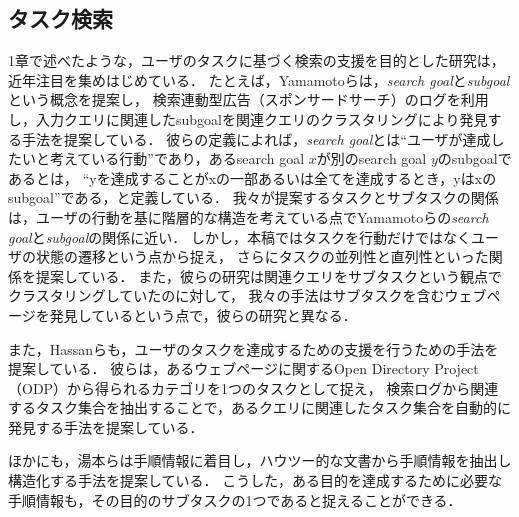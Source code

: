 \documentclass[submit,techreq]{ipsj}
\begin{document}
\subsection{タスク検索}
1章で述べたような，ユーザのタスクに基づく検索の支援を目的とした研究は，近年注目を集めはじめている．
たとえば，Yamamotoらは，\textit{search goal}と\textit{subgoal}という概念を提案し，
検索連動型広告（スポンサードサーチ）のログを利用し，入力クエリに関連したsubgoalを関連クエリのクラスタリングにより発見する手法を提案している\cite{yamamoto2012wisdom}．
彼らの定義によれば，\textit{search goal}とは``ユーザが達成したいと考えている行動''であり，あるsearch goal $x$が別のsearch goal $y$のsubgoalであるとは，
``yを達成することがxの一部あるいは全てを達成するとき，yはxのsubgoal''である，と定義している．
我々が提案するタスクとサブタスクの関係は，ユーザの行動を基に階層的な構造を考えている点でYamamotoらの\textit{search goal}と\textit{subgoal}の関係に近い．
しかし，本稿ではタスクを行動だけではなくユーザの状態の遷移という点から捉え，
さらにタスクの並列性と直列性といった関係を提案している．
また，彼らの研究は関連クエリをサブタスクという観点でクラスタリングしていたのに対して，
我々の手法はサブタスクを含むウェブページを発見しているという点で，彼らの研究と異なる．

また，Hassanらも，ユーザのタスクを達成するための支援を行うための手法を提案している\cite{hassan2012task}．
彼らは，あるウェブページに関するOpen Directory Project（ODP）から得られるカテゴリを1つのタスクとして捉え，
検索ログから関連するタスク集合を抽出することで，あるクエリに関連したタスク集合を自動的に発見する手法を提案している．

ほかにも，湯本らは手順情報に着目し，ハウツー的な文書から手順情報を抽出し構造化する手法を提案している\cite{yumotoHowTo}．
こうした，ある目的を達成するために必要な手順情報も，その目的のサブタスクの1つであると捉えることができる．

%
\end{document}
